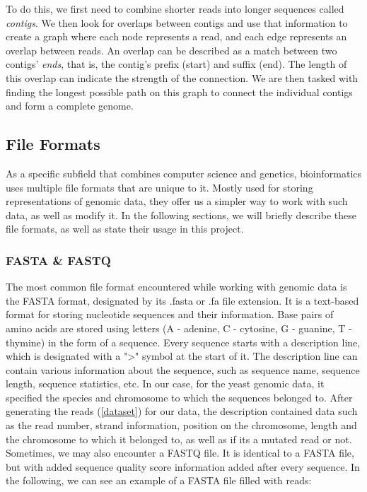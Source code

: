 \documentclass[times, utf8, diplomski, english]{fer_eng}
\begin{document}
To do this, we first need to combine shorter reads into longer sequences called \textit{contigs}. We then look for overlaps between contigs and use that information to create a graph where each node represents a read, and each edge represents an overlap between reads. An overlap can be described as a match between two contigs' \textit{ends}, that is, the contig's prefix (start) and suffix (end). The length of this overlap can indicate the strength of the connection. We are then tasked with finding the longest possible path on this graph to connect the individual contigs and form a complete genome.

\subsection{File Formats}

As a specific subfield that combines computer science and genetics, bioinformatics uses multiple file formats that are unique to it. Mostly used for storing representations of genomic data, they offer us a simpler way to work with such data, as well as modify it. In the following sections, we will briefly describe these file formats, as well as state their usage in this project.

\subsubsection{FASTA \& FASTQ}

The most common file format encountered while working with genomic data is the FASTA format, designated by its .fasta or .fa file extension. It is a text-based format for storing nucleotide sequences and their information. Base pairs of amino acids are stored using letters (A - adenine, C - cytosine, G - guanine, T - thymine) in the form of a sequence. Every sequence starts with a description line, which is designated with a ">" symbol at the start of it. The description line can contain various information about the sequence, such as sequence name, sequence length, sequence statistics, etc. In our case, for the yeast genomic data, it specified the species and chromosome to which the sequences belonged to. After generating the reads (\ref{dataset}) for our data, the description contained data such as the read number, strand information, position on the chromosome, length and the chromosome to which it belonged to, as well as if its a mutated read or not. Sometimes, we may also encounter a FASTQ file. It is identical to a FASTA file, but with added sequence quality score information added after every sequence. In the following, we can see an example of a FASTA file filled with reads:
\end{document}
